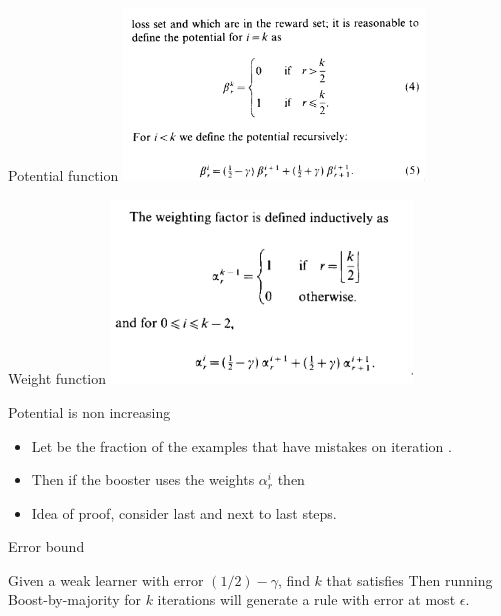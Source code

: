 \documentclass{beamer}
\begin{document}
\begin{frame}{Potential function}
\includegraphics[width=8cm]{figures/BBMPotential.png}
\end{frame}

\begin{frame}{Weight function}
\includegraphics[width=8cm]{figures/BBMWeighting.png}
\end{frame}

\begin{frame}{Potential is non increasing}
  \begin{itemize}
  \item Let  be the fraction of the examples that have
     mistakes on iteration . 
  \item Then if the booster uses the weights $\alpha_r^i$ then
    \R{\[
        \beta_{0}^{0}
        \;>\;
        \sum_{r=0}^{1} q_{r}^{1}\,\beta_{r}^{1}
        \;>\;
        \sum_{r=0}^{2} q_{r}^{2}\,\beta_{r}^{2}
        \;>\;
        \cdots
        \;>\;
        \sum_{r=0}^{k} q_{r}^{k}\,\beta_{r}^{k}.
      \]}
    \item Idea of proof, consider last and next to last steps.
  \end{itemize}

\end{frame}

\begin{frame}{Error bound}

  Given a weak learner with error $(1/2)-\gamma$, find $k$ that satisfies
\R{\[
  \sum_{j=0}^{\left\lfloor \frac{k}{2} \right\rfloor}
  \binom{k}{j}
  \bigl(\tfrac12 + \gamma\bigr)^{j}\,
  \bigl(\tfrac12 - \gamma\bigr)^{\,k - j}
  \;\;\le\;\;
  \epsilon.
\]}
Then running Boost-by-majority for $k$ iterations will generate a rule with 
error at most $\epsilon$.

\end{frame}
\end{document}

